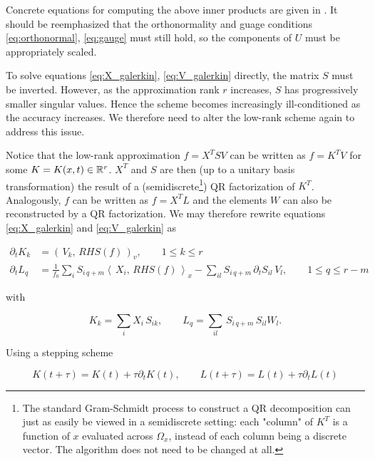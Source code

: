 Concrete equations for computing the above inner products are given in 
\cite{robustlowrank}. It should be reemphasized that the orthonormality and guage 
conditions \ref{eq:orthonormal}, \ref{eq:gauge} must still hold, so the components of $U$ 
must be appropriately scaled. 

To solve equations \ref{eq:X_galerkin}, \ref{eq:V_galerkin} directly, the matrix $S$ must 
be inverted. However, as the approximation rank $r$ increases, $S$ has progressively 
smaller singular values. Hence the scheme becomes increasingly ill-conditioned as the 
accuracy increases. We therefore need to alter the low-rank scheme again to address this 
issue. 

Notice that the low-rank approximation $f = X^T S V$ can be written as $f = K^T V$ for 
some $K = K(x, t) \in \mathbb{R}^r$. $X^T$ and $S$ are then (up to a unitary basis 
transformation) the result of a (semidiscrete\footnote{
    The standard Gram-Schmidt process to construct a QR decomposition can just as easily 
    be viewed in a semidiscrete setting: each "column" of $K^T$ is a function of $x$ 
    evaluated across $\Omega_x$, instead of each column being a discrete vector. The 
    algorithm does not need to be changed at all. 
}) QR factorization of $K^T$. Analogously, $f$ can be written as $f = X^T L$ and the 
elements $W$ can also be reconstructed by a QR factorization. We may therefore rewrite 
equations \ref{eq:X_galerkin} and \ref{eq:V_galerkin} as 

\begin{align}
    \partial_t K_k &= (\,V_k,\, RHS(f)\,)_v, \quad\quad 1 \leq k \leq r \label{eq:K_galerkin}\\
    \partial_t L_q &= 
        \frac{1}{f_0} \sum_i S_{i\, q+m} \left\langle\, X_i,\, RHS(f) \,\right\rangle_x 
        - \sum_{i l} S_{i\, q+m}\, \partial_t S_{i l}\, V_l ,
        \quad\quad 1 \leq q \leq r - m \label{eq:L_galerkin} 
\end{align}

with 

\begin{equation}
    K_k = \sum_i X_i\, S_{i k}, \quad\quad L_q = \sum_{i l}\, S_{i\, q+m}\, S_{i l} W_l . 
\end{equation}

Using a stepping scheme

\begin{equation}
    \label{eq:K_L_update}
    K (t + \tau) = K (t) + \tau \partial_t K (t), \quad\quad
    L (t + \tau) = L (t) + \tau \partial_t L (t)
\end{equation}

